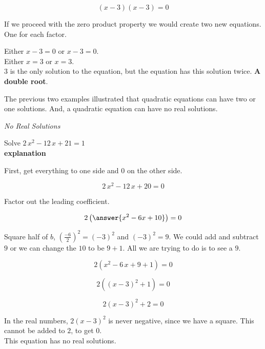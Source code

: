 \documentclass{ximera}
\begin{document}
\[  (x - 3) (x - 3) = 0  \]


If we proceed with the zero product property we would create two new equations.  One for each factor.

Either $x - 3 = 0$   or $x - 3 = 0$. \\

Either $x = 3$ or $x = 3$.  \\

$3$ is the only solution to the equation, but the equation has this solution twice. \textbf{\textcolor{red!80!black}{A double root}}.


The previous two examples illustrated that quadratic equations can have two or one solutions.  And, a quadratic equation can have no real solutions.










\begin{example} \textit{No Real Solutions}

Solve $2 \, x^2 - 12 \, x + 21 = 1$ \\


\textbf{explanation}


First, get everything to one side and $0$ on the other side.



\[  2 \, x^2 - 12 \, x + 20 = 0  \]

Factor out the leading coefficient.

\[  2 \left( \answer{x^2 - 6x + 10} \right) = 0  \]


Square half of $b$, $\left(\frac{-6}{2}\right)^2 = (-3)^2$ and $(-3)^2 = 9$.  We could add and subtract $9$ or we can change the $10$ to be $9+1$.  All we are trying to do is to see a $9$.



\[  2 (x^2 - 6 \, x + 9 + 1) = 0  \]


\[  2 ((x-3)^2 + 1) = 0  \]


\[  2 (x-3)^2 + 2 = 0  \]

In the real numbers, $2 (x-3)^2$ is never negative, since we have a square.  This cannot be added to $2$, to get $0$.  \\


This equation has no real solutions.



\end{example}
\end{document}
